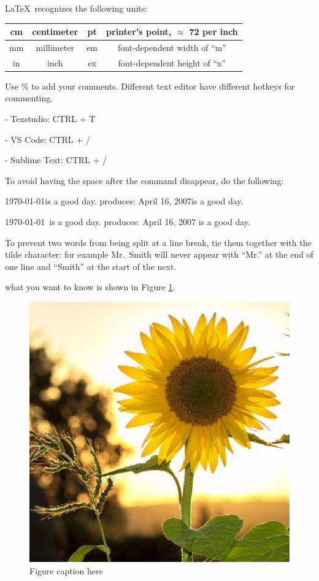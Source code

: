 \documentclass[a4paper,11pt,UTF8,openright]{book}
\begin{document}
\LaTeX\ recognizes the following units:
\vskip 0.2in
\begin{tabular}{|c|c||c|c|}
  \hline 
  cm & centimeter & pt & printer’s point, $\approx$ 72 per inch \\ \hline
  mm & millimeter & em & font-dependent width of “m” \\ 	\hline
  in & inch & ex & font-dependent height of “x” \\ 	\hline
\end{tabular}
\vskip 0.2in

Use \% to add your comments. Different text editor have different hotkeys for commenting.

- Texstudio: CTRL + T

- VS Code: CTRL + /

- Sublime Text: CTRL + /

To avoid having the space after the command disappear, do the following:

\today is a good day. produces: April 16, 2007is a good day.

\today\ is a good day. produces: April 16, 2007 is a good day.

To prevent two words from being split at a line break, tie them together with the tilde character: for example Mr.~Smith will never appear with “Mr.” at the end of one line and “Smith” at the start of the next.


what you want to know is shown in Figure \ref{fig:29571453.jpg}.

\begin{figure}[!htbp]
  \centering
  \includegraphics[width=\textwidth]{flower}
  \caption{Figure caption here}
  \label{fig:29571453.jpg}
\end{figure}
\end{document}
